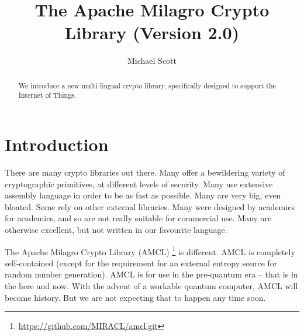 \documentclass{llncs}
\begin{document}
\pagestyle{plain}

\title{The Apache Milagro Crypto Library (Version 2.0)}

\author{
Michael Scott 
}

\institute{}


\maketitle

\begin{abstract}

We introduce a new multi-lingual crypto library, specifically designed to support the Internet of Things.

\end{abstract} 

\section{Introduction}\label{sec:intro}

There are many crypto libraries out there. Many offer a bewildering variety of cryptographic primitives, at different levels of security. Many use extensive assembly language 
in order to be as fast as possible. Many are very big, even bloated. Some rely on other external libraries. Many were designed by academics for academics, and so are not really suitable for 
commercial use. Many are otherwise excellent, but not written in our favourite language.

The Apache Milagro Crypto Library (AMCL) \footnote{\url{https://github.com/MIRACL/amcl.git}} is different. AMCL is completely self-contained (except for the requirement for an external entropy source for random number generation). 
AMCL is for use in the pre-quantum era -- that is in the here and now. With 
the advent of a workable quantum computer, AMCL will become history. But we are not expecting that to happen any time soon.
\end{document}
